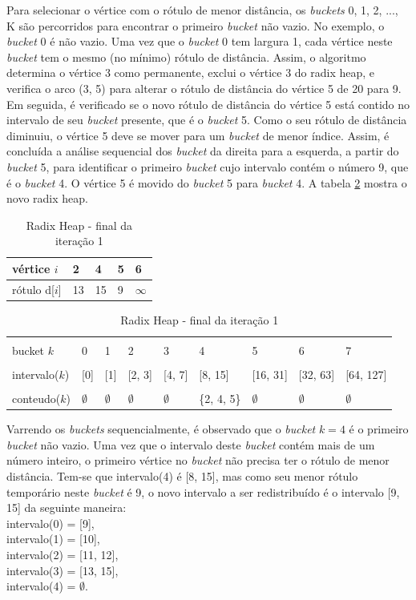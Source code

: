 Para selecionar o vértice com o rótulo de menor distância, os \textit{buckets} 0, 1, 2, ..., K são percorridos para encontrar o
primeiro \textit{bucket} não vazio. No exemplo, o \textit{bucket} 0 é não vazio. Uma vez que o \textit{bucket} 0 tem largura 1,
cada vértice neste \textit{bucket} tem o mesmo (no mínimo) rótulo de distância. Assim, o algoritmo determina o vértice 3 como permanente,
exclui o vértice 3 do radix heap, e verifica o arco (3, 5) para alterar o rótulo de distância do vértice 5 de 20 para 9.
Em seguida, é verificado se o novo rótulo de distância do vértice 5 está contido no intervalo de seu \textit{bucket} presente,
que é o \textit{bucket} 5. Como o seu rótulo de distância diminuiu, o vértice 5 deve se mover para um \textit{bucket} de menor índice.
Assim, é concluída a análise sequencial dos \textit{bucket} da direita para a esquerda, a partir do \textit{bucket} 5,
para identificar o primeiro \textit{bucket} cujo intervalo contém o número 9, que é o \textit{bucket} 4.
O vértice 5 é movido do \textit{bucket} 5 para \textit{bucket} 4. A tabela \ref{tab:secondradixheap} mostra o novo radix heap.

\begin{table}[htbp]
  \centering
  \begin{tabular}{l l l l l}
  \toprule
  vértice $i$ & 2 & 4 & 5 & 6\\
  \midrule
  rótulo d[$i$] & 13 & 15 & 9 & $\infty$ \\
  \bottomrule
  \end{tabular}
  
  \centering
  \begin{tabular}{l l l l l l l l l}
  \toprule
  \\bucket $k$ & 0 & 1 & 2 & 3 & 4 & 5 & 6 & 7\\
  \midrule
  \\intervalo($k$) & [0] & [1] & [2, 3] & [4, 7] & [8, 15] & [16, 31] & [32, 63] & [64, 127]\\
  \\conteudo($k$) & $\emptyset$ & $\emptyset$ & $\emptyset$ & $\emptyset$ & \{2, 4, 5\} & $\emptyset$ & $\emptyset$ & $\emptyset$\\
  \bottomrule
  \end{tabular}
\caption{Radix Heap - final da iteração 1}
 \label{tab:secondradixheap}
\end{table}
\FloatBarrier
Varrendo os \textit{buckets} sequencialmente, é observado que o \textit{bucket} $k = 4$ é o primeiro \textit{bucket} não vazio.
Uma vez que o intervalo deste \textit{bucket} contém mais de um número inteiro, o primeiro vértice no \textit{bucket} não precisa ter
o rótulo de menor distância. Tem-se que intervalo(4) é [8, 15], mas como seu menor rótulo temporário neste \textit{bucket} é 9,
o novo intervalo a ser redistribuído é o intervalo [9, 15] da seguinte maneira:\\
intervalo(0) = [9],\\
intervalo(1) = [10],\\
intervalo(2) = [11, 12],\\
intervalo(3) = [13, 15],\\
intervalo(4) = $\emptyset$.

